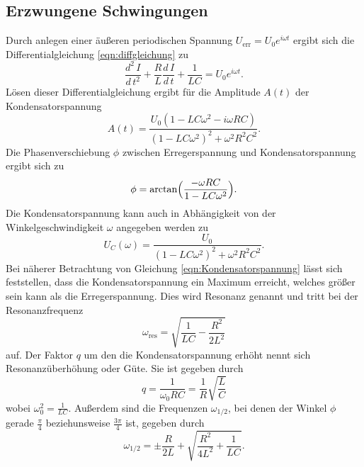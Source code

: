     \subsection{Erzwungene Schwingungen}        
        Durch anlegen einer äußeren periodischen Spannung $U_\text{err} = U_0 e^{i \omega t }$ ergibt sich die Differentialgleichung \eqref{eqn:diffgleichung}
        zu
        \begin{equation}
            \label{eqn:diffgleichung2}
            \frac{d^2 \, I}{d \, t^2} + \frac{R}{L} \frac{d \, I}{d \, t} + \frac {1}{L C} = U_0 e^{i \omega t}.
        \end{equation}    
        Lösen dieser Differentialgleichung ergibt für die Amplitude $A(t)$ der Kondensatorspannung
        \begin{equation}
            \label{eqn:amplitude}
            A(t) = \frac{U_0 (1 - L C \omega^2 - i \omega R C)}{(1 - L C \omega^2)^2 + \omega^2 R^2 C^2}.
        \end{equation}
        Die Phasenverschiebung $\phi$ zwischen Erregerspannung und Kondensatorspannung ergibt sich zu
        \begin{equation}
            \label{eqn:phasenverschiebung}
            \phi = \arctan \Bigl( \frac {- \omega R C} {1 - L C \omega^2} \Bigr).
        \end{equation}
        Die Kondensatorspannung kann auch in Abhängigkeit von der Winkelgeschwindigkeit $\omega$ angegeben werden zu
        \begin{equation}
            \label{eqn:Kondensatorspannung}
            U_C(\omega) = \frac {U_0} {(1 - L C \omega^2)^2 + \omega^2 R^2 C^2}.
        \end{equation}
        Bei näherer Betrachtung von Gleichung \eqref{eqn:Kondensatorspannung} lässt sich feststellen, dass die Kondensatorspannung
        ein Maximum erreicht, welches größer sein kann als die Erregerspannung. Dies wird Resonanz genannt und tritt bei der Resonanzfrequenz
        \begin{equation}
            \label{eqn:Resonanzfrequenz}
            \omega_\text{res} = \sqrt{\frac{1}{L C} - \frac{R^2}{2 L^2}}
        \end{equation}
        auf. Der Faktor $q$ um den die Kondensatorspannung erhöht nennt sich Resonanzüberhöhung oder Güte. 
        Sie ist gegeben durch 
        \begin{equation} 
            \label{eqn:güte}
            q = \frac{1}{\omega_0 R C} = \frac{1}{R} \sqrt{\frac{L}{C}}
        \end{equation}
        wobei $\omega_0^2 = \frac{1}{L C}$.   
       Außerdem sind die Frequenzen $\omega_\text{$1/2$}$, bei denen
        der Winkel $\phi$ gerade $\frac{\pi}{4}$ beziehunsweise $\frac{3 \pi}{4}$ ist, gegeben durch
        \begin{equation}
            \label{eqn:omega12}
            \omega_\text{$1/2$} = \pm \frac{R}{2 L} + \sqrt{\frac{R^2}{4 L^2} + \frac{1}{L C} }.
        \end{equation}    
